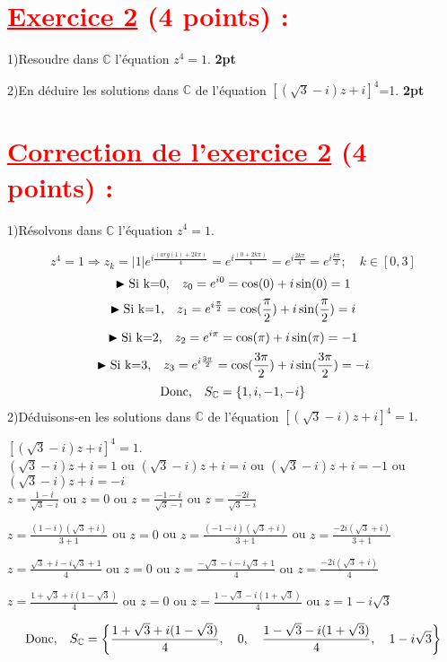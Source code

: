 \documentclass[12pt]{article}
\begin{document}
\section*{\textcolor{red}{\underline{Exercice 2} (4 points) :}}
1)Resoudre dans $\mathbb{C}$ l'équation $z^{4}=1$. \textbf{2pt}

2)En déduire les solutions dans $\mathbb{C}$ de l'équation $\left[\left(\sqrt{3}-i\right)z+i  \right]^{4}$=1. \textbf{2pt}
\section*{\textcolor{red}{\underline{Correction de l'exercice 2} (4 points) :}}
1)Résolvons dans $\mathbb{C}$ l'équation $z^{4}=1$.

\[z^{4}=1\Rightarrow z_{k}=|1|e^{i\frac{(arg(1)+2k\pi)}{4}}=e^{i\frac{(0+2k\pi)}{4}}=e^{i\frac{2k\pi}{4}}=e^{i\frac{k\pi}{2}};\quad k\in \left[0,3\right]  \]
\[\blacktriangleright\text{Si k=0,\quad }z_{0}=e^{i0}=\cos(0)+i\sin(0)=1\]
\[\blacktriangleright\text{Si k=1,\quad }z_{1}=e^{i\frac{\pi}{2}}=\cos(\frac{\pi}{2})+i\sin(\frac{\pi}{2})=i\]
\[\blacktriangleright\text{Si k=2,\quad }z_{2}=e^{i\pi}=\cos(\pi)+i\sin(\pi)=-1\]
\[\blacktriangleright\text{Si k=3,\quad }z_{3}=e^{i\frac{3\pi}{2}}=\cos(\frac{3\pi}{2})+i\sin(\frac{3\pi}{2})=-i\]
\[\text{Donc,\quad} S_{\mathbb{C}}=\left\lbrace 1, i, -1, -i \right\rbrace \]
2)Déduisons-en les solutions dans $\mathbb{C}$ de l'équation $\left[\left(\sqrt{3}-i\right)z+i  \right]^{4}=1.$

$\left[\left(\sqrt{3}-i\right)z+i  \right]^{4}=1.$\\
$\left(\sqrt{3}-i\right)z+i=1$ ou $\left(\sqrt{3}-i\right)z+i=i$ ou $\left(\sqrt{3}-i\right)z+i=-1$ ou $\left(\sqrt{3}-i\right)z+i=-i$\\
$z=\frac{1-i}{\sqrt{3}-i}$ ou $z=0$ ou $z=\frac{-1-i}{\sqrt{3}-i}$ ou $z=\frac{-2i}{\sqrt{3}-i}$

$z=\frac{(1-i)(\sqrt{3}+i)}{3+1}$ ou $z=0$ ou $z=\frac{(-1-i)(\sqrt{3}+i)}{3+1}$ ou $z=\frac{-2i(\sqrt{3}+i)}{3+1}$

$z=\frac{\sqrt{3}+i-i\sqrt{3}+1}{4}$ ou $z=0$ ou $z=\frac{-\sqrt{3}-i-i\sqrt{3}+1}{4}$ ou $z=\frac{-2i(\sqrt{3}+i)}{4}$

$z=\frac{1+\sqrt{3}+i(1-\sqrt{3})}{4}$ ou $z=0$ ou $z=\frac{1-\sqrt{3}-i(1+\sqrt{3})}{4}$ ou $z=1-i\sqrt{3}$

\[\text{Donc,\quad} S_{\mathbb{C}}=\left\lbrace \frac{1+\sqrt{3}+i(1-\sqrt{3})}{4},\quad 0,\quad \frac{1-\sqrt{3}-i(1+\sqrt{3})}{4},\quad 1-i\sqrt{3} \right\rbrace \]
\end{document}
